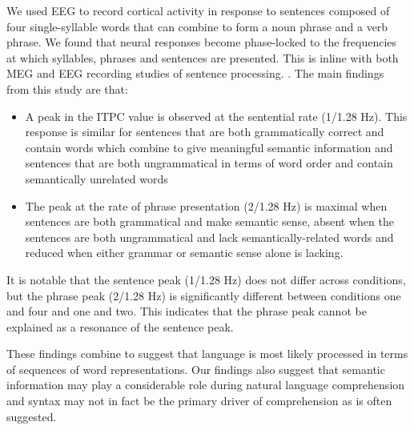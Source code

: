 \documentclass[a4paper,10pt,twoside]{article}
\begin{document}
We used EEG to record cortical activity in response to sentences
composed of four single-syllable words that can combine to form a noun
phrase and a verb phrase. We found that neural responses become
phase-locked to the frequencies at which syllables, phrases and
sentences are presented. This is inline with both MEG and EEG
recording studies of sentence processing.
\cite{DingEtAl2015,DingEtAl2017}. The main findings from this study
are that:
\begin{itemize}
\item A peak in the ITPC value is observed at the sentential rate
  (1/1.28 Hz). This response is similar for sentences that are both
  grammatically correct and contain words which combine to give
  meaningful semantic information and sentences that are both
  ungrammatical in terms of word order and contain semantically
  unrelated words
\item The peak at the rate of phrase presentation
  (2/1.28 Hz) is maximal when sentences are both grammatical and make
  semantic sense, absent when the sentences are both ungrammatical and
  lack semantically-related words and reduced when either grammar or
  semantic sense alone is lacking. 
\end{itemize}
%
% 
%
It is notable that the sentence peak (1/1.28 Hz) does not differ
across conditions, but the phrase peak (2/1.28 Hz) is significantly
different between conditions one and four and one and two. This indicates that the
phrase peak cannot be explained as a resonance of the sentence peak.

%
% 
%
These findings combine to suggest that language is most likely
processed in terms of sequences of word representations. Our findings
also suggest that semantic information may play a considerable role
during natural language comprehension and syntax may not in fact be
the primary driver of comprehension as is often suggested.
\end{document}
